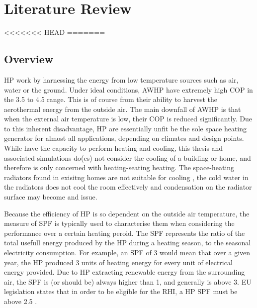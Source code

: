 \chapter{Literature Review}\label{ch:litreview}


<<<<<<< HEAD
=======


\section{Overview}
\acs{HP} work by harnessing the energy from low temperature sources such as air, water or the ground. 
Under ideal conditions, \acs{AWHP} have extremely high \acs{COP} in the \num{3.5} to \num{4.5} range. This is of course from their ability to harvest the aerothermal energy from the outside air. The main downfall of \acs{AWHP} is that when the external air temperature is low, their \ac{COP} is reduced significantly. Due to this inherent disadvantage, \acs{HP} are essentially unfit be the sole space heating generator for almost all applications, depending on climates and design points. While \HPs have the capacity to perform heating and cooling, this thesis and associated simulations do(es) not consider the cooling of a building or home, and therefore is only concerned with heating-seating heating. The space-heating radiators found in exisitng homes are not suitable for cooling \cite{klein_numerical_2014}, the cold water in the radiators does not cool the room effectively and condensation on the radiator surface may become and issue. 

Because the efficiency of \acs{HP} is so dependent on the outside air temperature, the measure of \ac{SPF} is typically used to characterise them when considering the performance over a certain heating peroid. The \ac{SPF} represents the ratio of the total usefull energy produced by the \ac{HP} during a heating season, to the seasonal electricity consumption. For example, an \ac{SPF} of 3 would mean that over a given year, the \ac{HP} produced 3 units of heating energy for every unit of electrical energy provided. Due to \acs{HP} extracting renewable energy from the surrounding air, the \ac{SPF} is (or should be) always higher than 1, and generally is above 3. EU legislation states that in order to be eligible for the \ac{RHI}, a \acs{HP} \ac{SPF} must be above 2.5 \cite{eu-114-2014}. 


